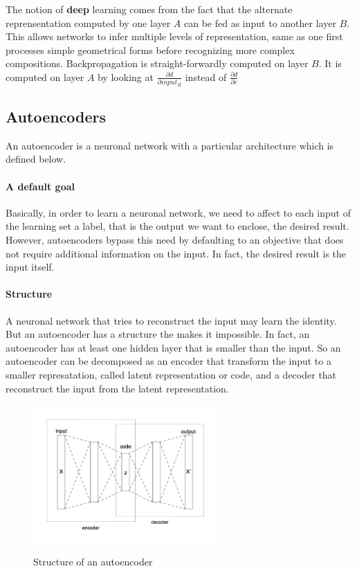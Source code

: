 \documentclass[conference]{IEEEtran}
\begin{document}
The notion of \textbf{deep} learning comes from the fact that the alternate
reprensentation computed by one layer $A$ can be fed as input to another layer $B$.
This allows networks to infer multiple levels of representation, same as one
first processes simple geometrical forms before recognizing more complex
compositions. Backpropagation is straight-forwardly computed on layer $B$. It is
computed on layer $A$ by looking at $\frac{\partial d}{\partial input_B}$
instead of $\frac{\partial d}{\partial e}$
\subsection{Autoencoders}

An autoencoder is a neuronal network with a particular architecture which is defined below.

\paragraph{A default goal}
Basically, in order to learn a neuronal network, we need to affect to each input of the learning set a label, that is the output we want to enclose, the desired result. However, autoencoders bypass this need by defaulting to an objective that does not require additional information on the input. In fact, the desired result is the input itself.

\paragraph{Structure}
A neuronal network that tries to reconstruct the input may learn the identity. But an autoencoder has a structure the makes it impossible. In fact, an autoencoder has at least one hidden layer that is smaller than the input. So an autoencoder can be decomposed as an encoder that transform the input to a smaller represatation, called latent representation or code, and a decoder that reconstruct the input from the latent representation.

\begin{figure}[!h]
    \centering
    \caption{Structure of an autoencoder}
    \includegraphics[width=7cm]{Autoencoder_structure.png}
    \label{autoencoder_structure}
\end{figure}
\end{document}
